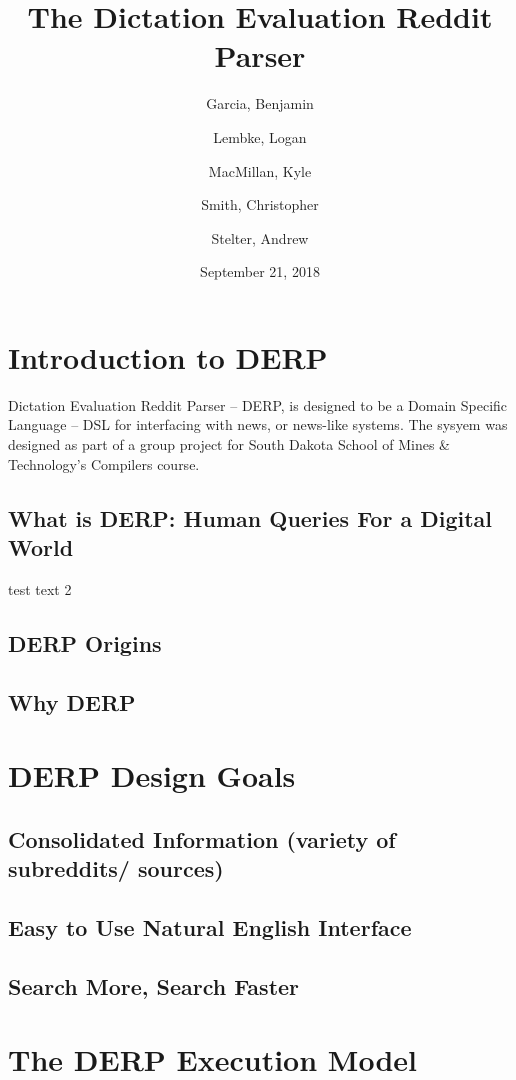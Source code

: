 \documentclass{book}
\title{The Dictation Evaluation Reddit Parser}
\author{
Garcia, Benjamin \and
Lembke, Logan \and 
MacMillan, Kyle  \and 
Smith, Christopher \and 
Stelter, Andrew 
}
\date{September 21, 2018}
\begin{document}
\maketitle

\tableofcontents

\newpage


\chapter{Introduction to DERP}
\setcounter{page}{1} %
Dictation Evaluation Reddit Parser -- DERP, is designed to be a Domain Specific Language -- DSL for interfacing with news, or news-like systems. The sysyem was designed as part of a group project for South Dakota School of Mines \& Technology's Compilers course.

\section{What is DERP: Human Queries For a Digital World}
test text 2
\section{DERP Origins}
\section{Why DERP}

\chapter{DERP Design Goals}
\section{Consolidated Information (variety of subreddits/ sources)}
\section{Easy to Use Natural English Interface}
\section{Search More, Search Faster}

\chapter{The DERP Execution Model}
\end{document}
